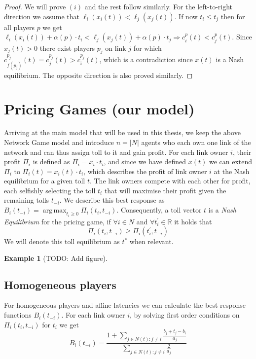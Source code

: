 \documentclass[10pt,a4paper]{book}
\newcommand{\R}{\mathbb{R}}
\DeclareMathOperator*{\argmax}{arg\,max}
\theoremstyle{definition}
\theoremstyle{comment}
\newtheorem{example}[definition]{Example}
\begin{document}
\begin{proof}
	We will prove $(i)$ and the rest follow similarly.
	For the left-to-right direction we assume that $\ell_i(x_i(t)) < \ell_j(x_j(t))$.
	If now $t_i \le t_j$ then for all players $p$ we get $\ell_i(x_i(t)) + \alpha(p) \cdot t_i < \ell_j(x_j(t)) + \alpha(p) \cdot t_j \Rightarrow c_i^p(t) < c_j^p(t)$.
	Since $x_j(t) > 0$ there exist players $p_j$ on link $j$ for which $c_{f(p_j)}^{p_j}(t) = c_j^{p_j}(t) > c_i^{p_j}(t)$, which is a contradiction since $x(t)$ is a Nash equilibrium.
	The opposite direction is also proved similarly.
\end{proof}

\section*{Pricing Games (our model)}

Arriving at the main model that will be used in this thesis, we keep the above Network Game model and introduce $n = |N|$ agents who each own one link of the network and can thus assign toll to it and gain profit.
For each link owner $i$, their profit $\Pi_i$ is defined as $\Pi_i = x_i \cdot t_i$, and since we have defined $x(t)$ we can extend $\Pi_i$ to $\Pi_i(t) = x_i(t) \cdot t_i$, which describes the profit of link owner $i$ at the Nash equilibrium for a given toll $t$.
The link owners compete with each other for profit, each selfishly selecting the toll $t_i$ that will maximise their profit given the remaining tolls $t_{-i}$.
We describe this best response as $B_i(t_{-i}) = \argmax_{t_i \geq 0} \Pi_i(t_i, t_{-i})$.
Consequently, a toll vector $t$ is a \textit{Nash Equilibrium} for the pricing game, if $\forall i \in N$ and $\forall t_i^\prime \in \R$ it holds that
\[\Pi_i(t_i, t_{-i}) \geq \Pi_i(t_i^\prime, t_{-i})\]
We will denote this toll equilibrium as $t^*$ when relevant.

\begin{example}
	[TODO: Add figure]
\end{example}

\subsection*{Homogeneous players}

For homogeneous players and affine latencies we can calculate the best response functions $B_i(t_{-i})$.
For each link owner $i$, by solving first order conditions on $\Pi_i(t_i, t_{-i})$ for $t_i$ we get
\begin{equation}
	\label{eq:homogeneous_br_i}
	B_i(t_{-i}) = \frac{1 + \sum_{j \in N(t) : j \ne i}\frac{b_j + t_j - b_i}{a_j}}{\sum_{j \in N(t) : j \ne i}\frac{2}{a_j}}
\end{equation}
\end{document}
